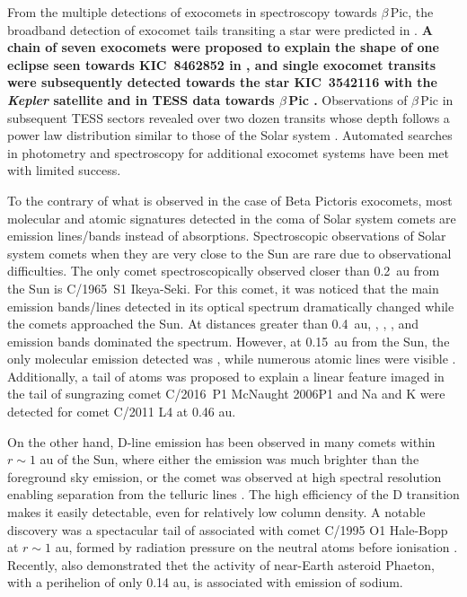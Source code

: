 \documentclass{aa}
\newcommand{\bp}{$\beta$\,Pic}
\begin{document}
From the multiple detections of exocomets in spectroscopy towards \bp{}, the broadband detection of exocomet tails transiting a star were predicted in \citet{1999A&A...343..916L}.
%
{\bf A chain of seven exocomets were proposed to explain the shape of one eclipse seen towards KIC~8462852 in \citet{Kiefer17}, and
single exocomet transits were subsequently detected towards the star KIC~3542116 \citep{Rappaport18} with the {\it Kepler} satellite \citep{Borucki10} and in TESS data towards \bp{} \citep{Zieba19}.}
%
Observations of \bp{} in subsequent TESS sectors revealed over two dozen transits whose depth follows a power law distribution similar to those of the Solar system \citep{LecavelierdesEtangs22,Pavlenko22}.
%
Automated searches in photometry \citep{Kennedy19} and spectroscopy \citep{BendahanWest24} for additional exocomet systems have been met with limited success.

To the contrary of what is observed in the case of Beta Pictoris exocomets, most molecular and atomic signatures detected in the coma of Solar system comets are emission lines/bands instead of absorptions.
%
Spectroscopic observations of Solar system comets when they are very close to the Sun are rare due to observational difficulties.
%
The only comet spectroscopically observed closer than 0.2~au from the Sun is C/1965~S1 Ikeya-Seki.
%
For this comet, it was noticed that the main emission bands/lines detected in its optical spectrum dramatically changed while the comets approached the Sun.
%
At distances greater than 0.4~au, , , , and  emission bands dominated the spectrum.
%
However, at 0.15~au from the Sun, the only molecular emission detected was , while numerous atomic lines were visible \citep[, , , , , , , , , ; ][]{Dufay65,Thackeray1966,Preston1967,Slaughter1969}.
%
Additionally, a tail of  atoms was proposed to explain a linear feature imaged in the tail of sungrazing comet C/2016~P1 McNaught 2006P1 \citep{Fulle2007} and Na and K were detected for comet C/2011 L4 \citep{Fulle13} at 0.46 au. 

On the other hand,  D-line emission has been observed in many comets within $r \sim 1$ au of the Sun, where either the emission was much brighter than the foreground sky emission, or the comet was observed at high spectral resolution enabling separation from the telluric lines \citep{Cremonese02,Schmidt16}.
%
The high efficiency of the  D transition makes it easily detectable, even for relatively low column density.
%
A notable discovery was a spectacular tail of  associated with comet C/1995 O1 Hale-Bopp at $r\sim 1$ au, formed by radiation pressure on the neutral atoms before ionisation \citep{Cremonese1997}.
%
Recently, \cite{Hui2023} also demonstrated thet the activity of near-Earth asteroid Phaeton, with a perihelion of only 0.14 au, is associated with emission of sodium. 
\end{document}
